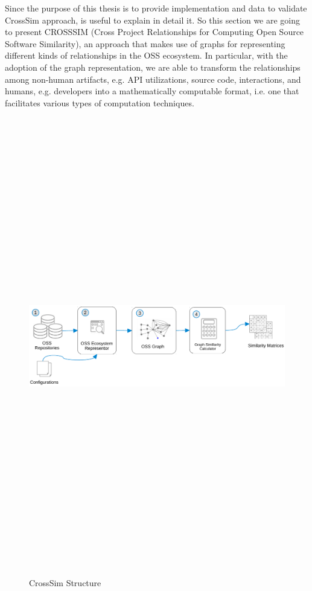 Since the purpose of this thesis is to provide implementation and data to validate CrossSim approach, is useful to explain in detail it.
So this section we are going to present CROSSSIM (Cross Project Relationships for Computing Open Source Software Similarity), an approach that makes use of graphs for representing different kinds of relationships in the OSS ecosystem. In particular, with the adoption of the graph representation, we are able to transform the relationships among non-human artifacts, e.g. API utilizations,
source code, interactions, and humans, e.g. developers into a mathematically computable format, i.e. one that facilitates various types of computation techniques.
 
\begin{figure}[H]
\includegraphics[width=15cm,height=20cm,keepaspectratio]{images/CrossSim.pdf}
\caption{CrossSim Structure}
\label{fig:CrossSim}
\end{figure}

